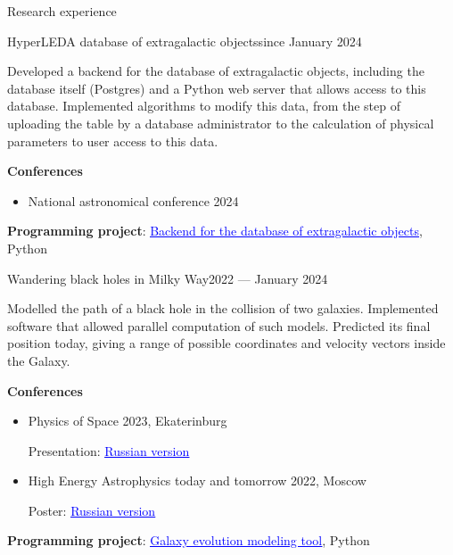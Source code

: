 \documentclass{resume} %
\newcommand{\link}[2]{\href{#1}{\textcolor{blue}{\underline{#2}}}}
\newcommand{\subheader}[2]{
	{\textbf{#1}} \ifthenelse{\equal{#2}{}}{}{\timestamp{#2}}
}
\begin{document}
	\begin{rSection}{Research experience}
		\begin{rSubsection}{HyperLEDA database of extragalactic objects}{since January 2024}{}{}{}
			\item Developed a backend for the database of extragalactic objects, including the database itself (Postgres) and a Python web server that allows access to this database. Implemented algorithms to modify this data, from the step of uploading the table by a database administrator to the calculation of physical parameters to user access to this data.
			\item \subheader{Conferences}{}
			\begin{itemize}
				\item National astronomical conference 2024 
			\end{itemize}
			\item \textbf{Programming project}: \link{https://github.com/HyperLEDA/db-app}{Backend for the database of extragalactic objects}, Python 
		\end{rSubsection}
		\begin{rSubsection}{Wandering black holes in Milky Way}{2022 --- January 2024}{}{}{}
			\item Modelled the path of a black hole in the collision of two galaxies. Implemented software that allowed parallel computation of such models. Predicted its final position today, giving a range of possible coordinates and velocity vectors inside the Galaxy.
			\item \subheader{Conferences}{}
			\begin{itemize}
				\item Physics of Space 2023, Ekaterinburg 
				
				Presentation: \link{https://www.overleaf.com/read/mnwwgvkqxdky}{Russian version}
				\item High Energy Astrophysics today and tomorrow 2022, Moscow 
				
				Poster: \link{https://www.overleaf.com/read/cwyptqpmdtdf}{Russian version}
			\end{itemize}

			\item \textbf{Programming project}: \link{https://github.com/Kraysent/OMTool}{Galaxy evolution modeling tool}, Python 
		\end{rSubsection}



\end{rSection}
\end{document}
